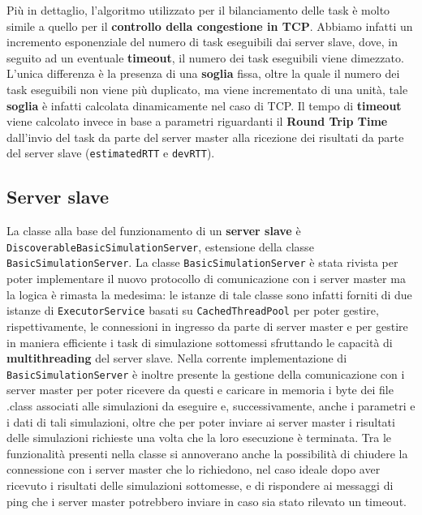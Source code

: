 Più in dettaglio, l'algoritmo utilizzato per il bilanciamento delle task è molto simile a quello per il \textbf{controllo della congestione in TCP}. Abbiamo infatti un incremento esponenziale del numero di task eseguibili dai server slave, dove, in seguito ad un eventuale \textbf{timeout}, il numero dei task eseguibili viene dimezzato. L'unica differenza è la presenza di una \textbf{soglia} fissa, oltre la quale il numero dei task eseguibili non viene più duplicato, ma viene incrementato di una unità, tale \textbf{soglia} è infatti calcolata dinamicamente nel caso di TCP. Il tempo di \textbf{timeout} viene calcolato invece in base a parametri riguardanti il \textbf{Round Trip Time} dall'invio del task da parte del server master alla ricezione dei risultati da parte del server slave (\texttt{estimatedRTT} e \texttt{devRTT}).

\subsection{Server slave}
La classe alla base del funzionamento di un \textbf{server slave} è \texttt{DiscoverableBasicSimulationServer}, estensione della classe \texttt{BasicSimulationServer}.
La classe \texttt{BasicSimulationServer} è stata rivista per poter implementare il nuovo protocollo di comunicazione con i server master ma la logica è rimasta la medesima:
le istanze di tale classe sono infatti forniti di due istanze di \texttt{ExecutorService} basati su \texttt{CachedThreadPool} per poter gestire, rispettivamente, le connessioni in ingresso da parte di server master
e per gestire in maniera efficiente i task di simulazione sottomessi sfruttando le capacità di \textbf{multithreading} del server slave.
Nella corrente implementazione di \texttt{BasicSimulationServer} è inoltre presente la gestione della comunicazione con i server master per poter ricevere da questi e caricare in memoria i byte dei file .class associati
alle simulazioni da eseguire e, successivamente, anche i parametri e i dati di tali simulazioni, oltre che per poter inviare ai server master i risultati delle simulazioni richieste una volta che la loro esecuzione è terminata.
Tra le funzionalità presenti nella classe si annoverano anche la possibilità di chiudere la connessione con i server master che lo richiedono, nel caso ideale dopo aver ricevuto i risultati delle simulazioni sottomesse,
e di rispondere ai messaggi di ping che i server master potrebbero inviare in caso sia stato rilevato un timeout. 

